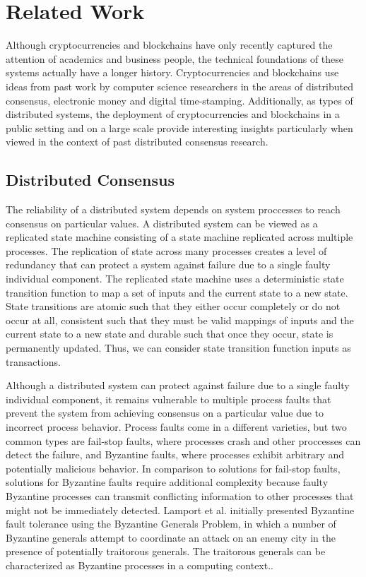 \section{Related Work}

Although cryptocurrencies and blockchains have only recently captured the attention of academics and
business people, the technical foundations of these systems actually have a longer
history. Cryptocurrencies and blockchains use ideas from past work by computer science
researchers in the areas of distributed consensus, electronic money
and digital time-stamping. Additionally, as types of distributed systems, the
deployment of cryptocurrencies and blockchains in a public
setting and on a large scale provide interesting insights particularly when viewed in the
context of past distributed consensus research.

\subsection{Distributed Consensus}

The reliability of a distributed system depends on system proccesses to
reach consensus on particular values. A distributed system can be viewed as a
replicated state machine consisting of a state machine replicated across
multiple processes. The replication of state across many processes creates a level of redundancy that
can protect a system against failure due to a single faulty individual component. The
replicated state machine uses a deterministic state transition function to map a set
of inputs and the current state to a new state\cite{faulttolerant}. State
transitions are atomic such that they either occur completely or do not occur at
all, consistent such that they must be valid mappings of inputs and the current
state to a new state and durable such that once they occur, state is permanently
updated. Thus, we can consider state transition function inputs as transactions\cite{transactions}.

Although a distributed system can protect against failure due to a single faulty
individual component, it remains vulnerable to multiple process faults that
prevent the system from achieving consensus on a particular value due to
incorrect process behavior. Process faults come in a different varieties, but
two common types are fail-stop faults, where processes crash and other proccesses can detect the failure, and
Byzantine faults, where processes exhibit arbitrary and potentially
malicious behavior\cite{faulttolerant}. In comparison to solutions for fail-stop
faults, solutions for Byzantine faults require additional complexity because
faulty Byzantine processes can transmit conflicting information to other processes that might
not be immediately detected. Lamport et al. initially presented Byzantine fault
tolerance using the Byzantine Generals Problem, in which a number of Byzantine
generals attempt to coordinate an attack on an enemy city in the presence of
potentially traitorous generals. The traitorous generals can be characterized as
Byzantine processes in a computing context.\cite{byzantine}.

